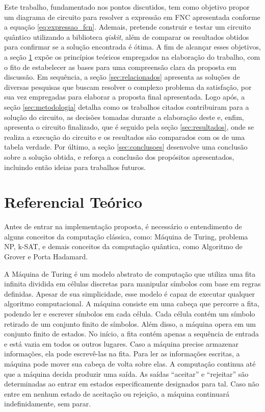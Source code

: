 \documentclass[12pt]{article}
\begin{document}
Este trabalho, fundamentado nos pontos discutidos, tem como objetivo propor um diagrama de circuito para resolver a expressão em FNC apresentada conforme a equação \ref{eq:expressao_fcn}. Ademais, pretende construir e testar um circuito quântico utilizando a biblioteca \textit{qiskit}, além de comparar os resultados obtidos para confirmar se a solução encontrada é ótima. A fim de alcançar esses objetivos, a seção \ref{sec:teorico} expõe os princípios teóricos empregados na elaboração do trabalho, com o fito de estabelecer as bases para uma compreensão clara da proposta em discussão. Em sequência, a seção \ref{sec:relacionados} apresenta as soluções de diversas pesquisas que buscam resolver o complexo problema da satisfação, por sua vez empregadas para elaborar a proposta final apresentada. Logo após, a seção \ref{sec:metodologia} detalha como os trabalhos citados contribuiram para a solução do circuito, as decisões tomadas durante a elaboração deste e, enfim, apresenta o circuito finalizado, que é seguido pela seção \ref{sec:resultados}, onde se realiza a execução do circuito e os resultados são comparados com os de uma tabela verdade. Por último, a seção \ref{sec:conclusoes} desenvolve uma conclusão sobre a solução obtida, e reforça a conclusão dos propósitos apresentados, incluindo então ideias para trabalhos futuros.


\section{Referencial Teórico}\label{sec:teorico}

Antes de entrar na implementação proposta, é necessário o entendimento de alguns conceitos da computação clássica, como: Máquina de Turing, problema NP, k-SAT, e demais conceitos da computação quântica, como Algoritmo de Grover e Porta Hadamard.

A Máquina de Turing é um modelo abstrato de computação que utiliza uma fita infinita dividida em células discretas para manipular símbolos com base em regras definidas. Apesar de sua simplicidade, esse modelo é capaz de executar qualquer algoritmo computacional. A máquina consiste em uma cabeça que percorre a fita, podendo ler e escrever símbolos em cada célula. Cada célula contém um símbolo retirado de um conjunto finito de símbolos. Além disso, a máquina opera em um conjunto finito de estados. No início, a fita contém apenas a sequência de entrada e está vazia em todos os outros lugares. Caso a máquina precise armazenar informações, ela pode escrevê-las na fita. Para ler as informações escritas, a máquina pode mover sua cabeça de volta sobre elas. A computação continua até que a máquina decida produzir uma saída. As saídas ``aceitar'' e ``rejeitar'' são determinadas ao entrar em estados especificamente designados para tal. Caso não entre em nenhum estado de aceitação ou rejeição, a máquina continuará indefinidamente, sem parar.
\end{document}
